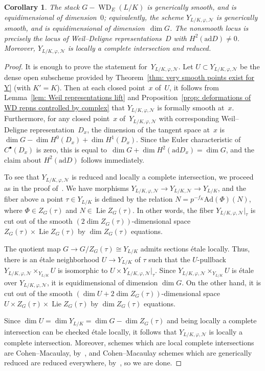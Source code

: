 \documentclass{amsart}
\def\Ad{\mathrm{Ad}}
\DeclareMathOperator{\Lie}{Lie}
\def\ad{\mathrm{ad}}
\newtheorem{cor}[subsubsection]{Corollary}
\theoremstyle{definition}
\theoremstyle{remark}
\DeclareMathOperator{\WD}{WD}
\begin{document}
\begin{cor}\label{cor: WD stack is generically smooth zero dimensional
  controlled by H2}
  The stack $G-\WD_E(L/K)$ is generically smooth, and is
  equidimensional of dimension~$0$; equivalently, the scheme $Y_{L/K,\varphi,\mathcal N}$  is
  generically smooth, and is equidimensional of dimension~$\dim
  G$.  The nonsmooth locus is precisely the locus of Weil--Deligne
  representations~$D$ with $H^2(\ad D)\ne 0$.   Moreover, $Y_{L/K,\varphi,\mathcal N}$ is locally a complete intersection and reduced.
\end{cor}
\begin{proof}
  It is enough to prove the statement for~$Y_{L/K,\varphi,\mathcal N}$. Let
  $U\subset Y_{L/K,\varphi,\mathcal N}$ be the dense open subscheme provided by
  Theorem~\ref{thm: very smooth points exist for Y} (with
  $K'=K$). Then at each closed point~$x$ of~$U$, it follows from
  Lemma~\ref{lem: Weil representations lift} and
  Proposition~\ref{prop: deformations of WD repns controlled by
    complex} that $Y_{L/K,\varphi,\mathcal N}$ is formally smooth
  at~$x$. Furthermore, for any closed point~$x$ of~$Y_{L/K,\varphi,\mathcal N}$
  with corresponding Weil--Deligne representation~$D_x$, the dimension
  of the tangent space at~$x$ is $\dim G-\dim H^0(D_x)+\dim
  H^1(D_x)$. Since the Euler characteristic of $C^\bullet(D_x)$ is zero,
  this is equal to~$\dim G+\dim H^2(\ad D_x)=\dim G$, and the claim about $H^2(\ad D)$ 
  follows immediately.

To see that $Y_{L/K,\varphi,\mathcal N}$ is reduced and locally a complete intersection, we proceed as in the proof of~\cite[Corollary 5.4]{2014arXiv1403.1411B}.  We have morphisms $Y_{L/K,\varphi,\mathcal{N}}\rightarrow Y_{L/K,\mathcal N}\rightarrow Y_{L/K}$, and the fiber above a point $\tau\in Y_{L/K}$ is defined by the relation $N=p^{-f_K}\Ad(\Phi)(N)$, where $\Phi\in Z_G(\tau)$ and $N\in\Lie Z_G(\tau)$.  In other words, the fiber $Y_{L/K,\varphi,\mathcal N}|_\tau$ is cut out of the smooth $(2\dim Z_G(\tau))$-dimensional space $Z_G(\tau)\times \Lie Z_G(\tau)$ by $\dim Z_G(\tau)$ equations.  

The quotient map $G\rightarrow G/Z_G(\tau)\cong Y_{L/K}$ admits sections \'etale locally.  Thus, there is an \'etale neighborhood $U\rightarrow Y_{L/K}$ of $\tau$ such that the $U$-pullback $Y_{L/K,\varphi,\mathcal{N}}\times_{Y_{L/K}}U$ is isomorphic to $U\times Y_{L/K,\varphi,\mathcal N}|_\tau$.  Since $Y_{L/K,\varphi,\mathcal{N}}\times_{Y_{L/K}}U$ is \'etale over $Y_{L/K,\varphi,\mathcal N}$, it is equidimensional of dimension $\dim G$.  On the other hand, it is cut out of the smooth $(\dim U+2\dim Z_G(\tau))$-dimensional space $U\times Z_G(\tau)\times \Lie Z_G(\tau)$ by $\dim Z_G(\tau)$ equations.  

Since $\dim U=\dim Y_{L/K}=\dim G-\dim Z_G(\tau)$ and being locally a complete intersection can be checked \'etale locally, it follows that $Y_{L/K,\varphi,\mathcal{N}}$ is locally a complete intersection.  Moreover, schemes which are local complete intersections are Cohen--Macaulay, by~\cite[Theorem 21.3]{matsumura}, and Cohen--Macaulay schemes which are generically reduced are reduced everywhere, by~\cite[Theorem 17.3]{matsumura}, so we are done.
\end{proof}
\end{document}

